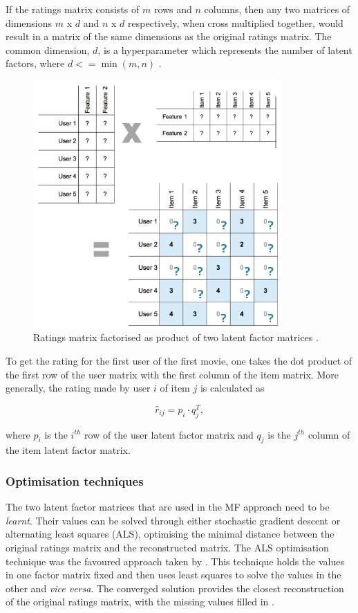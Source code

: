 If the ratings matrix consists of $m$ rows and $n$ columns, then any two matrices of dimensions $m$ x $d$ and $n$ x $d$ respectively, when cross multiplied together, would result in a matrix of the same dimensions as the original ratings matrix. The common dimension, $d$, is a hyperparameter which represents the number of latent factors, where $d <= \min(m,n)$ \parencite{bailey_2016}.

\begin{figure}[H]
\centering
\includegraphics[width=9.5cm]{Figures/2_4_matrix_factorization.png}
\decoRule
\caption[Matrix decomposition]{Ratings matrix factorised as product of two latent factor matrices \parencite{bailey_2016}.}
\label{fig:factors}
\end{figure}

To get the rating for the first user of the first movie, one takes the dot product of the first row of the user matrix with the first column of the item matrix. More generally, the rating made by user $i$ of item $j$ is calculated as

\begin{equation}
    \hat{r}_{ij} = p_i \cdot q_j^T,
\label{eqn:dot_prod}
\end{equation}

where $p_i$ is the $i^{th}$ row of the user latent factor matrix and $q_j$ is the $j^{th}$ column of the item latent factor matrix.

\subsubsection{Optimisation techniques}
The two latent factor matrices that are used in the MF approach need to be \textit{learnt}. Their values can be solved through either stochastic gradient descent or alternating least squares (ALS), optimising the minimal distance between the original ratings matrix and the reconstructed matrix. The ALS optimisation technique was the favoured approach taken by \cite{bellkor_2008}. This technique holds the values in one factor matrix fixed and then uses least squares to solve the values in the other and \textit{vice versa}. The converged solution provides the closest reconstruction of the original ratings matrix, with the missing values filled in \parencite{koren2009matrix}.

